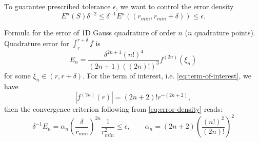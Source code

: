 \documentclass[preprint,12pt]{elsarticle}
\def\vc#1{\mathbf{\boldsymbol{#1}}}     %
\def\abs#1{\left|#1\right|}
\def\d{\mathrm{d}}
\def\abs#1{| #1 |}
\newcommand{\noteJB}[1]{{\color{Blue} \textbf{JB: } \textit{#1}}}
\begin{document}
To guarantee prescribed tolerance $\epsilon$, we want to control the error density
\begin{equation}
    \label{eq:error-density}
     E^n(S) \delta^{-2} \le \delta^{-1} E^n((r_{min}, r_{min}+\delta)) \le \epsilon. 
\end{equation}

Formula for the error of 1D Gauss quadrature of order $n$ ($n$ quadrature points). Quadrature error for $\int_r^{r+\delta} f$ is 
\[
  E_n = \frac{\delta^{2n+1} (n!)^4}{(2n+1)((2n)!)^3} f^{(2n)}(\xi_n) 
\]
for some $\xi_n \in (r, r+\delta)$. 
For the term of interest, i.e. \eqref{eq:term-of-interest}, we have 
\[
  \abs{f^{(2n)}(r)} = (2n+2)! r^{-(2n+2)},
\]
then the convergence criterion following from \eqref{eq:error-density} reads:
\[
  \delta^{-1}E_n = \alpha_n \left( \frac{\delta}{r_{min}} \right)^{2n} \frac{1}{r_{min}^2} \le \epsilon, 
  \qquad \alpha_n = (2n+2)\left( \frac{(n!)^2}{(2n)!} \right)^2
\]

\end{document}
